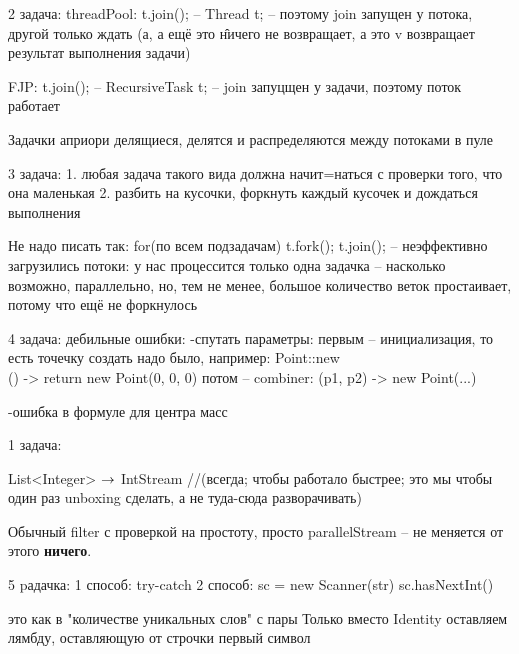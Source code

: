2 задача: 
threadPool: t.join(); -- Thread t; -- поэтому join запущен у потока, другой только ждать
(а, а ещё это \^ ничего не возвращает, а это v возвращает результат выполнения задачи)

FJP: 	    t.join(); -- RecursiveTask t; -- join запуцщен у задачи, поэтому поток работает

Задачки априори делящиеся, делятся и распределяются между потоками в пуле

3 задача:
	1. любая задача такого вида должна начит=наться с проверки того, что она маленькая
	2. разбить на кусочки, форкнуть каждый кусочек и дождаться выполнения

	Не надо писать так:
	for(по всем подзадачам) {
		t.fork();
		t.join(); -- неэффективно загрузились потоки: у нас процессится только одна задачка -- насколько возможно, параллельно, но, тем не менее, большое количество веток простаивает, потому что ещё не форкнулось
	}

4 задача:
	дебильные ошибки:
		-спутать параметры: первым -- инициализация, то есть точечку создать надо было, например: Point::new \\ () -> {return new Point(0, 0, 0)}
	потом -- combiner: (p1, p2) -> new Point(...)

		-ошибка в формуле для центра масс

1 задача:

List<Integer> $\rightarrow$ IntStream //(всегда; чтобы работало быстрее; это мы чтобы один раз unboxing сделать, а не туда-сюда разворачивать)

Обычный filter с проверкой на простоту, просто parallelStream -- не меняется от этого \textbf{ничего}.


5 pадачка:
1 способ: try-catch
2 способ: 
	sc = new Scanner(str)
	sc.hasNextInt()

это как в "количестве уникальных слов" с пары
Только вместо Identity оставляем лямбду, оставляющую от строчки первый символ


